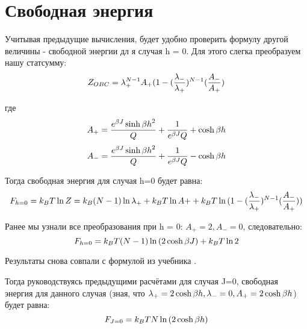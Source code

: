 \section{Свободная энергия}
Учитывая предыдущие вычисления, будет удобно проверить формулу другой величины - свободной энергии дл 
я случая h = 0. Для этого слегка преобразуем нашу статсумму:
\[ Z_{OBC} = \lambda_{+}^{N-1}A_{+}(1 - (\frac{\lambda_{-}}{\lambda_{+}})^{N-1}(\frac{A_{-}}{A_{+}}) \]

где \[ A_{+} = \frac{e^{\beta J} \sinh{\beta h}^2}{Q} + \frac{1}{e^{\beta J}Q} +  \cosh{\beta h}\]
\[ A_{-} = \frac{e^{\beta J} \sinh{\beta h}^2}{Q} + \frac{1}{e^{\beta J}Q} -  \cosh{\beta h}\]

Тогда свободная энергия для случая h=0 будет равна:
\[ F_{h=0} = k_{B}T\ln{Z} =  k_{B}(N-1)\ln{\lambda_{+}} + k_{B}T\ln{A+} + k_{B}T\ln{(1 - (\frac{\lambda_{-}}{\lambda_{+}})^{N-1}(\frac{A_{-}}{A_{+}}))}\]

Ранее мы узнали все преобразования при h = 0: $A_{+} = 2, A_{-} = 0$, следовательно:
\[ F_{h=0} = k_{B}T(N-1)\ln{(2\cosh{\beta J})} + k_{B}T\ln{2}\]

Результаты снова совпали с формулой из учебника \cite{swendsen2020introduction}.

Тогда руководствуясь предыдущими расчётами для случая J=0, свободная энергия для данного случая (зная, что $\lambda_{+} = 2\cosh{\beta h}, \lambda_{-} = 0, A_{+} = 2\cosh{\beta h}$) будет равна:
\[ F_{J=0} = k_{B}T N \ln{(2\cosh{\beta h})}\]